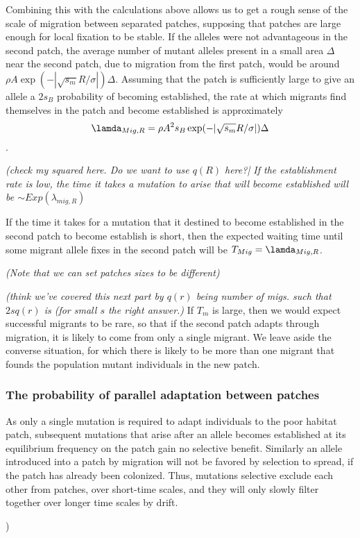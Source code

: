 \documentclass{article}
\newcommand{\gc}[1]{{ \it \color{green} (#1) } }
\begin{document}
Combining this with the calculations above allows us to get a rough sense of the scale of migration between separated patches,
supposing that patches are large enough for local fixation to be stable. If the alleles were not advantageous in the second patch,
the average number of mutant alleles present in a small area $\Delta$
near the second patch, due
to migration from the first patch, would be around $\rho A \exp( -
|\sqrt{s_m} R/\sigma| ) \Delta$. Assuming that the patch is
sufficiently large to give an allele a $2s_B$ probability of becoming established, the rate at which migrants find
themselves in the patch and become established  is approximately
\begin{equation}
\lamda_{Mig,R} = \rho A^2 s_B \exp( -|\sqrt{s_m} R/\sigma| ) \Delta
\end{equation}
. \gc{check my squared here. Do we want to use $q(R)$ here?|
If the establishment rate is low, the time it takes
a mutation to arise that will become established will be  $\sim Exp(\lambda_{mig,R})$

If  the time it takes for a mutation that it destined to 
become established in the second patch to become establish is short,
then  the expected waiting time until some migrant allele fixes in the
second patch will be $T_{Mig} = \lamda_{Mig,R} $.

\gc{Note that we can set patches sizes to be different}


\gc{think we've covered this next part by $q(r)$ being number of migs. such
that $2sq(r)$ is (for small $s$ the right answer.}
If $T_m$ is large, then we would expect successful migrants to be rare,
so that if the second patch adapts through migration, it is likely to come from only a single migrant.
We leave aside the converse situation, for which there is likely to be more than one migrant
that founds the population mutant individuals in the new patch.


\subsubsection{The probability of parallel adaptation between patches} 
\label{ss:probparallel}



As only a single mutation is required to adapt individuals to the
poor habitat patch, subsequent mutations that arise after an allele
becomes established at its equilibrium frequency on the patch gain no selective
benefit. Similarly an allele introduced into a patch by migration will
not be favored by selection to spread, if the patch has already been
colonized. Thus, mutations selective exclude each other from
patches, over short-time scales, and they will only slowly filter
together over longer time scales by drift. 

}
\end{document}
